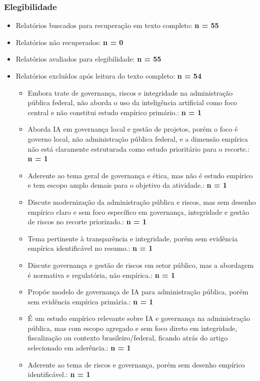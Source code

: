 \documentclass[12pt,a4paper]{article}
\begin{document}
\subsubsection{Elegibilidade}
\label{sec:org3b30399}
\begin{itemize}
\item Relatórios buscados para recuperação em texto completo: \textbf{n = 55}
\item Relatórios não recuperados: \textbf{n = 0}
\item Relatórios avaliados para elegibilidade: \textbf{n = 55}
\item Relatórios excluídos após leitura do texto completo: \textbf{n = 54}
\begin{itemize}
\item Embora trate de governança, riscos e integridade na administração pública federal, não aborda o uso da inteligência artificial como foco central e não constitui estudo empírico primário.: \textbf{n = 1}
\item Aborda IA em governança local e gestão de projetos, porém o foco é governo local, não administração pública federal, e a dimensão empírica não está claramente estruturada como estudo prioritário para o recorte.: \textbf{n = 1}
\item Aderente ao tema geral de governança e ética, mas não é estudo empírico e tem escopo amplo demais para o objetivo da atividade.: \textbf{n = 1}
\item Discute modernização da administração pública e riscos, mas sem desenho empírico claro e sem foco específico em governança, integridade e gestão de riscos no recorte priorizado.: \textbf{n = 1}
\item Tema pertinente à transparência e integridade, porém sem evidência empírica identificável no resumo.: \textbf{n = 1}
\item Discute governança e gestão de riscos em setor público, mas a abordagem é normativa e regulatória, não empírica.: \textbf{n = 1}
\item Propõe modelo de governança de IA para administração pública, porém sem evidência empírica primária.: \textbf{n = 1}
\item É um estudo empírico relevante sobre IA e governança na administração pública, mas com escopo agregado e sem foco direto em integridade, fiscalização ou contexto brasileiro/federal, ficando atrás do artigo selecionado em aderência.: \textbf{n = 1}
\item Aderente ao tema de riscos e governança, porém sem desenho empírico identificável.: \textbf{n = 1}

\end{itemize}
\end{itemize}
\end{document}
